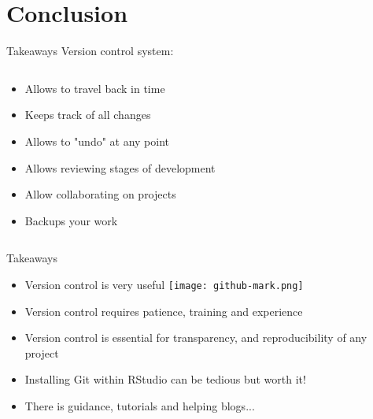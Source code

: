 \documentclass[xcolor=x11names,compress]{beamer}
\renewcommand{\(}{\begin{columns}}
\renewcommand{\)}{\end{columns}}
\newcommand{\<}[1]{\begin{column}{#1}}
\renewcommand{\>}{\end{column}}
\begin{document}
\section{Conclusion}

\begin{frame}{Takeaways}
Version control system:
\begin{columns}[t]
\begin{column}{0.6\textwidth}
\begin{itemize}[<+->]
    \item Allows to travel back in time
    \item Keeps track of all changes
    \item Allows to "undo" at any point
    \item Allows reviewing stages of development
    \item Allow collaborating on projects
    \item Backups your work
  \end{itemize}
 \end{column}
  \begin{column}{0.4\textwidth}
    \begin{center}
    \begin{itemize}
    \end{itemize}
    \end{center}
  \end{column}
\end{columns}
\end{frame}


\begin{frame}{Takeaways}
\pause

\begin{itemize}[<+->]
    \item Version control is very useful \texttt{[image: github-mark.png]}
    \item Version control requires patience, training and experience
    \item Version control is essential for transparency, and reproducibility of any project
    \item Installing Git within RStudio can be tedious but worth it!
    \item There is guidance, tutorials and helping blogs...
\end{itemize}
\end{frame}
\end{document}
